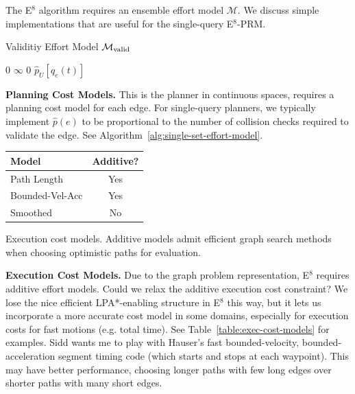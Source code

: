 The E$^8$ algorithm requires an ensemble effort model
$\mathcal{M}$.
We discuss simple implementations that are useful
for the single-query E$^8$-PRM.

\begin{algorithm}
\caption{Validitiy Effort Model
   $\mathcal{M}_{\mbox{\scriptsize valid}}$}
\label{alg:single-set-effort-model}
{\algrenewcommand\textproc{}%
\begin{algorithmic}[1]
      \State \Return $0$
   \Else
      \State \Return $\infty$
   \EndIf
\EndFunction
{}
   \State \Return $0$
\EndFunction
{}
   \State \Return $\hat{p}_U[q_e(t)]$
\EndFunction
\end{algorithmic}
} %
\end{algorithm}

\textbf{Planning Cost Models.}
This is the planner in continuous spaces,
requires a planning cost model for each edge.
For single-query planners,
we typically implement $\hat{p}(e)$ to be
proportional to the number of collision checks required
to validate the edge.
See Algorithm~\ref{alg:single-set-effort-model}.

\begin{margintable}
   \centering
   \begin{tabular}{lc}
      \toprule
      Model & Additive? \\
      \midrule
      Path Length & Yes \\
      Bounded-Vel-Acc & Yes \\
      Smoothed & No \\
      \bottomrule
   \end{tabular}
   \vspace{0.1in}
   \caption{Execution cost models.
      Additive models admit efficient graph search methods
      when choosing optimistic paths for evaluation.}
   \label{table:exec-cost-models}
\end{margintable}

\textbf{Execution Cost Models.}
Due to the graph problem representation,
E$^8$ requires additive effort models.
Could we relax the additive execution cost constraint?
We lose the nice efficient LPA*-enabling structure in
E$^8$ this way,
but it lets us incorporate a more accurate cost model in some domains,
especially for execution costs for fast motions (e.g. total time).
See Table~\ref{table:exec-cost-models} for examples.
Sidd wants me to play with Hauser's fast bounded-velocity,
bounded-acceleration segment timing code
(which starts and stops at each waypoint).
This may have better performance,
choosing longer paths with few long edges over
shorter paths with many short edges.

